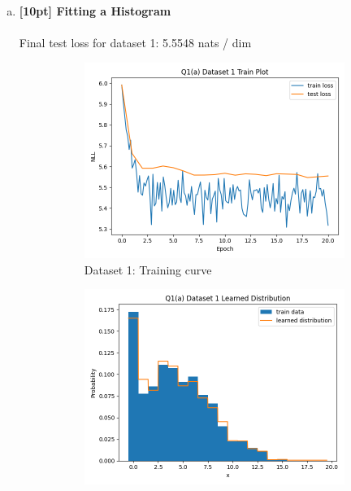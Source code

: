 \documentclass{article}
\begin{document}
\begin{enumerate}[(a)]

\item {\bf [10pt] Fitting a Histogram} \\\\
Final test loss for dataset 1: 5.5548 nats / dim
\begin{figure}[H]
    \centering
    \begin{subfigure}{0.45\textwidth}
        \centering
        \includegraphics[width=\textwidth]{figures/q1_a_dset1_train_plot.png}
        \caption{Dataset 1: Training curve}
    \end{subfigure}
    \hspace{0.2in}
    \begin{subfigure}{0.45\textwidth}
        \centering
        \includegraphics[width=\textwidth]{figures/q1_a_dset1_learned_dist.png}

\end{subfigure}
\end{figure}
\end{enumerate}
\end{document}
